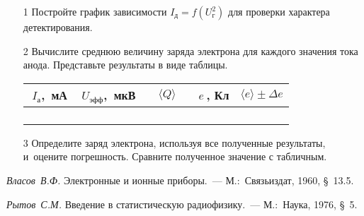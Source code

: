 \begin{lab:task}
\begin{enumerate}
	\item[1] Постройте график зависимости $I_{\text{д}}=f(U^2_{\text{г}})$ для проверки характера детектирования.

	\item[2] Вычислите среднюю величину заряда электрона для каждого значения тока анода. Представьте результаты в виде таблицы.

\begin{center}
\begin{tabular}{|c|c|c|c|c|}
\hline $\;I_{\text{а}}$,~мА&$\;U_{\text{эфф}}$,~мкВ&$\quad\langle Q\rangle\quad$&$e~$, Кл&$\langle e\rangle\pm\Delta e$\\\hline\hline
 & & & &\\
 & & & &\\
 & & & &\\
 & & & &\\
\hline
\end{tabular}
\end{center}

	\item[3] Определите заряд электрона, используя все полученные результаты, и~оцените погрешность. Сравните полученное значение
с табличным.
	\end{enumerate}
\end{lab:task}

\begin{lab:literature}
	\item \emph{Власов~В.Ф.} Электронные и ионные приборы.~--- М.:~Связьиздат, 1960, \S~13.5.

	\item \emph{Рытов~С.М.} Введение в статистическую радиофизику.~--- М.:~Наука, 1976, \S~5.
\end{lab:literature}
